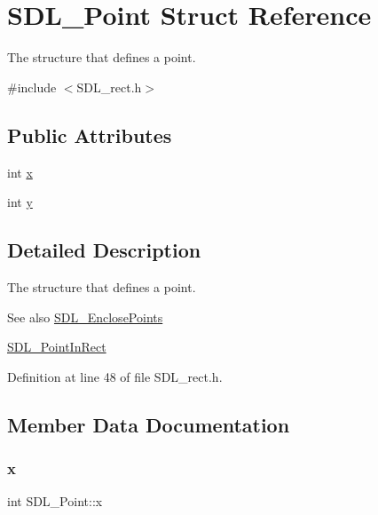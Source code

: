 \hypertarget{struct_s_d_l___point}{}\section{S\+D\+L\+\_\+\+Point Struct Reference}
\label{struct_s_d_l___point}


The structure that defines a point.  




{\ttfamily \#include $<$S\+D\+L\+\_\+rect.\+h$>$}

\subsection*{Public Attributes}
\begin{DoxyCompactItemize}
\item 
int \mbox{\hyperlink{struct_s_d_l___point_a2ee987d59888024771c8d83aec43056c}{x}}
\item 
int \mbox{\hyperlink{struct_s_d_l___point_aaa68aefa869f6bdf46367a70bd9414b0}{y}}
\end{DoxyCompactItemize}


\subsection{Detailed Description}
The structure that defines a point. 

\begin{DoxySeeAlso}{See also}
\mbox{\hyperlink{_s_d_l__rect_8h_afcbb58dbba760b9e6fdb4b5d1ece015c}{S\+D\+L\+\_\+\+Enclose\+Points}} 

\mbox{\hyperlink{_s_d_l__rect_8h_a2f9708f2739ef234c34e6feda50b4d2c}{S\+D\+L\+\_\+\+Point\+In\+Rect}} 
\end{DoxySeeAlso}


Definition at line 48 of file S\+D\+L\+\_\+rect.\+h.



\subsection{Member Data Documentation}
\mbox{\label{struct_s_d_l___point_a2ee987d59888024771c8d83aec43056c}} 
\subsubsection{\texorpdfstring{x}{x}}
{\footnotesize\ttfamily int S\+D\+L\+\_\+\+Point\+::x}



